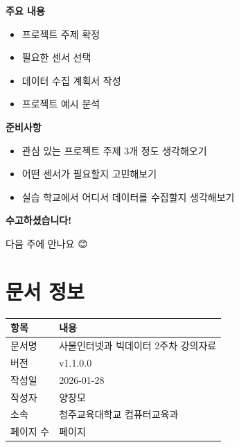 \documentclass[11pt, a4paper]{article}
\begin{document}
\begin{tcolorbox}[enhanced, colback=green!5, colframe=ForestGreen, 
                  title={\Large\textbf{3주차: 프로젝트 기획}}, fonttitle=\bfseries]

\textbf{주요 내용}
\begin{itemize}
  \item 프로젝트 주제 확정
  \item 필요한 센서 선택
  \item 데이터 수집 계획서 작성
  \item 프로젝트 예시 분석
\end{itemize}

\vspace{0.5em}

\textbf{준비사항}
\begin{itemize}
  \item 관심 있는 프로젝트 주제 3개 정도 생각해오기
  \item 어떤 센서가 필요할지 고민해보기
  \item 실습 학교에서 어디서 데이터를 수집할지 생각해보기
\end{itemize}

\end{tcolorbox}

\vfill

\begin{center}
\Large\textbf{수고하셨습니다!}

\vspace{1em}

\normalsize
다음 주에 만나요 😊
\end{center}

\newpage


\section*{문서 정보}

\begin{table}[H]
\centering
\begin{tabularx}{0.8\textwidth}{|l|X|}
\hline
\rowcolor{lightgray}
\textbf{항목} & \textbf{내용} \\
\hline
문서명 & 사물인터넷과 빅데이터 2주차 강의자료 \\
\hline
버전 & v1.1.0.0 \\
\hline
작성일 & 2026-01-28 \\
\hline
작성자 & 양창모 \\
\hline
소속 & 청주교육대학교 컴퓨터교육과 \\
\hline
페이지 수 & \pageref{LastPage} 페이지 \\
\hline
\end{tabularx}
\end{table}
\end{document}
